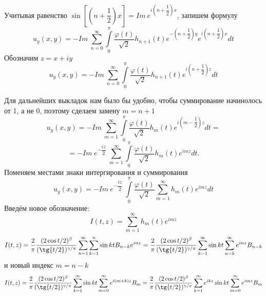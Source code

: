 \documentclass[a4paper, 9pt]{article}
\begin{document}
		Учитывая равенство
		$\sin{\left[\left(n + \dfrac12\right)x\right]} = Im \ e^{i\left(n + \dfrac12\right)x}$, запишем формулу
		\begin{equation*}
			u_y(x,y)  = -  Im \ \sum\limits_{n=0}^{\infty}  \int\limits_0^\pi \dfrac{\varphi(t)}{\sqrt2}  h_{n+1}(t)  e^{-\left(n + \dfrac12\right)y} e^{i\left(n + \dfrac12\right)x} dt
		\end{equation*}
		Обозначим $z = x + iy$
		\begin{equation*}
			u_y(x,y)  = -  Im \ \sum\limits_{n=0}^{\infty}  \int\limits_0^\pi \dfrac{\varphi(t)}{\sqrt2}  h_{n+1}(t)  e^{i\left(n+\dfrac12\right) z}  dt
		\end{equation*}
		\par
		Для дальнейших выкладок нам было бы удобно, чтобы суммирование начинолось от 1, а не 0, поэтому сделаем замену $m = n +1$
		\begin{equation*}
			u_y(x,y)  = -  Im \ \sum\limits_{m=1}^{\infty}  \int\limits_0^\pi \dfrac{\varphi(t)}{\sqrt2}  h_{m}(t)  e^{i\left(m-\dfrac12\right) z}  dt = 
		\end{equation*}
		\begin{equation*}
			 = -  Im \ e^{-\dfrac{iz}{2}}\ \sum\limits_{m=1}^{\infty}  \int\limits_0^\pi \dfrac{\varphi(t)}{\sqrt2}  h_{m}(t)  e^{im z}  dt .
		\end{equation*}
		Поменяем местами знаки интергирования и суммирования
		\begin{equation*}
			u_y(x,y)  = -  Im \ e^{-\dfrac{iz}{2}}\  \int\limits_0^\pi \dfrac{\varphi(t)}{\sqrt2}  \sum\limits_{m=1}^{\infty}   h_{m}(t)  e^{im z}  dt
		\end{equation*}
		Введём новое обозначение:
		\begin{equation*}
			I(t,z) = \sum\limits_{m=1}^{\infty}  h_{m}(t)  e^{im z}
		\end{equation*}
		\begin{equation*}
			I(t,z) =\dfrac{2}{\pi}\dfrac{(2\cos{t/2})^\beta}{(\tg{t/2})^{\gamma/\pi}} \sum\limits_{n=1}^{\infty}   \sum\limits_{k=1}^n \sin{kt} B_{n-k} e^{inz} = 
			\dfrac{2}{\pi}\dfrac{(2\cos{t/2})^\beta}{(\tg{t/2})^{\gamma/\pi}} \sum\limits_{k=1}^{\infty} \sin{kt} \sum\limits_{n=k}^{\infty} e^{inz} B_{n-k}
		\end{equation*}
		и новый индекс $m = n - k$
		\begin{equation*}
			I(t,z) = \dfrac{2}{\pi}\dfrac{(2\cos{t/2})^\beta}{(\tg{t/2})^{\gamma/\pi}} \sum\limits_{k=1}^{\infty} \sin{kt} \sum\limits_{m =0 }^{\infty} e^{i(m+k)z} B_{m} = 
			\dfrac{2}{\pi}\dfrac{(2\cos{t/2})^\beta}{(\tg{t/2})^{\gamma/\pi}} \sum\limits_{k=1}^{\infty} e^{ikz}\sin{kt} \sum\limits_{m =0 }^{\infty} e^{imz} B_{m}
		\end{equation*}
\end{document}
